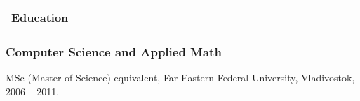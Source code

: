 \documentclass[a4paper]{article}
\begin{document}


	\begin{tabularx}{\textwidth}{@{}lX}
		\textbf{\large Education}\\
		\hline\hline
	\end{tabularx}
		\subsubsection*{Computer Science and Applied Math}
		MSc (Master of Science) equivalent, Far Eastern Federal University, Vladivostok, 2006 -- 2011.\\

\end{document}
